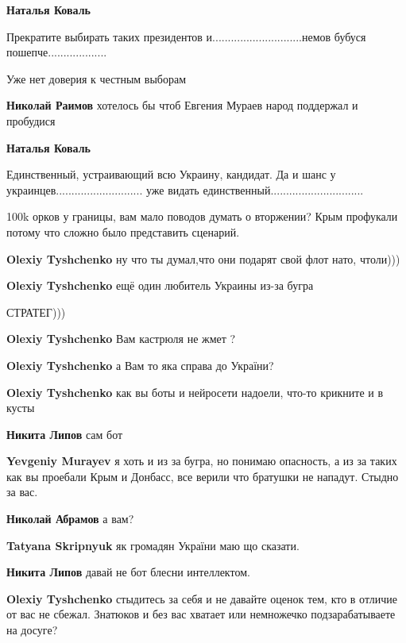 \begin{itemize}
\begin{itemize}
\textbf{Наталья Коваль} 

Прекратите выбирать таких президентов и.............................немов
бубуся пошепче...................


Уже нет доверия к честным выборам

\textbf{Николай Раимов} хотелось бы чтоб Евгения Мураев народ поддержал и пробудися

\textbf{Наталья Коваль} 

Единственный, устраивающий всю Украину, кандидат. Да и шанс у
украинцев............................ уже видать
единственный..............................

\end{itemize} %

100k орков у границы, вам мало поводов думать о вторжении?
Крым профукали потому что сложно было представить сценарий.

\begin{itemize} %
\textbf{Olexiy Tyshchenko} ну что ты думал,что они подарят свой флот нато, чтоли)))


\textbf{Olexiy Tyshchenko} ещё один любитель Украины из-за бугра

СТРАТЕГ)))

\textbf{Olexiy Tyshchenko} Вам кастрюля не жмет ?

\textbf{Olexiy Tyshchenko} а Вам то яка справа до України?

\textbf{Olexiy Tyshchenko} как вы боты и нейросети надоели, что-то крикните и в кусты

\textbf{Никита Липов} сам бот

\textbf{Yevgeniy Murayev} я хоть и из за бугра, но понимаю опасность, а из за таких как вы проебали Крым и Донбасс, все верили что братушки не нападут. Стыдно за вас.

\textbf{Николай Абрамов} а вам?

\textbf{Tatyana Skripnyuk} як громадян України маю що сказати.

\textbf{Никита Липов} давай не бот блесни интеллектом.

\textbf{Olexiy Tyshchenko} стыдитесь за себя и не давайте оценок тем, кто в отличие от вас не сбежал. Знатюков и без вас хватает или немножечко подзарабатываете на досуге?


\end{itemize}
\end{itemize}
